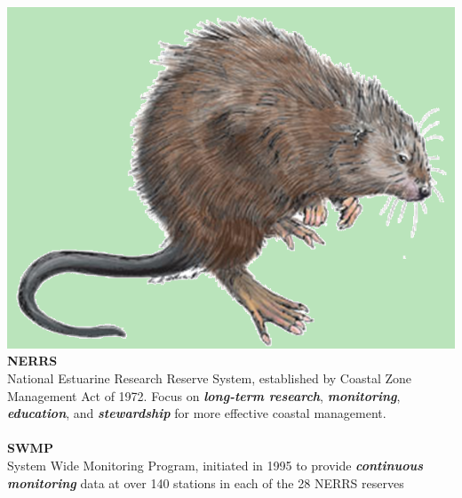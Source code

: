 \documentclass[serif]{beamer}\usepackage[]{graphicx}\usepackage[]{color}
\newcommand{\Bigtxt}[1]{\textbf{\textit{#1}}}
\begin{document}
\begin{frame}{\includegraphics[width=0.05\paperwidth]{fig/muskrat.png}\hspace{0.07in}{\bf What is NERRS/SWMP?}}{}
{\bf NERRS}\\
National Estuarine Research Reserve System, established by Coastal Zone Management Act of 1972. Focus on \Bigtxt{long-term research}, \Bigtxt{monitoring}, \Bigtxt{education}, and \Bigtxt{stewardship} for more effective coastal management.\\~\\
{\bf SWMP}\\
System Wide Monitoring Program, initiated in 1995 to provide \Bigtxt{continuous monitoring} data at over 140 stations in each of the 28 NERRS reserves \\~\\
\end{frame}
\end{document}
